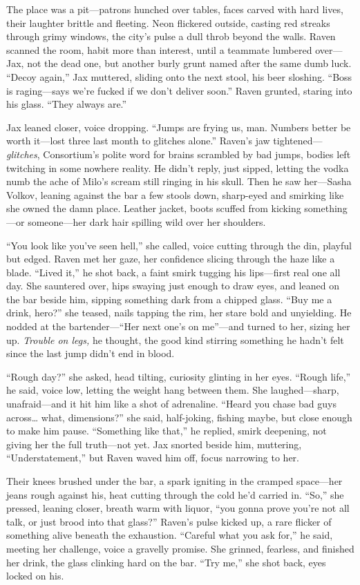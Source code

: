 \documentclass[12pt]{book}
\begin{document}
The place was a pit—patrons hunched over tables, faces carved with hard lives, their laughter brittle and fleeting. Neon flickered outside, casting red streaks through grimy windows, the city’s pulse a dull throb beyond the walls. Raven scanned the room, habit more than interest, until a teammate lumbered over—Jax, not the dead one, but another burly grunt named after the same dumb luck. “Decoy again,” Jax muttered, sliding onto the next stool, his beer sloshing. “Boss is raging—says we’re fucked if we don’t deliver soon.” Raven grunted, staring into his glass. “They always are.”

Jax leaned closer, voice dropping. “Jumps are frying us, man. Numbers better be worth it—lost three last month to glitches alone.” Raven’s jaw tightened—\textit{glitches}, Consortium’s polite word for brains scrambled by bad jumps, bodies left twitching in some nowhere reality. He didn’t reply, just sipped, letting the vodka numb the ache of Milo’s scream still ringing in his skull. Then he saw her—Sasha Volkov, leaning against the bar a few stools down, sharp-eyed and smirking like she owned the damn place. Leather jacket, boots scuffed from kicking something—or someone—her dark hair spilling wild over her shoulders.

“You look like you’ve seen hell,” she called, voice cutting through the din, playful but edged. Raven met her gaze, her confidence slicing through the haze like a blade. “Lived it,” he shot back, a faint smirk tugging his lips—first real one all day. She sauntered over, hips swaying just enough to draw eyes, and leaned on the bar beside him, sipping something dark from a chipped glass. “Buy me a drink, hero?” she teased, nails tapping the rim, her stare bold and unyielding. He nodded at the bartender—“Her next one’s on me”—and turned to her, sizing her up. \textit{Trouble on legs,} he thought, the good kind stirring something he hadn’t felt since the last jump didn’t end in blood.

“Rough day?” she asked, head tilting, curiosity glinting in her eyes. “Rough life,” he said, voice low, letting the weight hang between them. She laughed—sharp, unafraid—and it hit him like a shot of adrenaline. “Heard you chase bad guys across… what, dimensions?” she said, half-joking, fishing maybe, but close enough to make him pause. “Something like that,” he replied, smirk deepening, not giving her the full truth—not yet. Jax snorted beside him, muttering, “Understatement,” but Raven waved him off, focus narrowing to her.

Their knees brushed under the bar, a spark igniting in the cramped space—her jeans rough against his, heat cutting through the cold he’d carried in. “So,” she pressed, leaning closer, breath warm with liquor, “you gonna prove you’re not all talk, or just brood into that glass?” Raven’s pulse kicked up, a rare flicker of something alive beneath the exhaustion. “Careful what you ask for,” he said, meeting her challenge, voice a gravelly promise. She grinned, fearless, and finished her drink, the glass clinking hard on the bar. “Try me,” she shot back, eyes locked on his.
\end{document}
